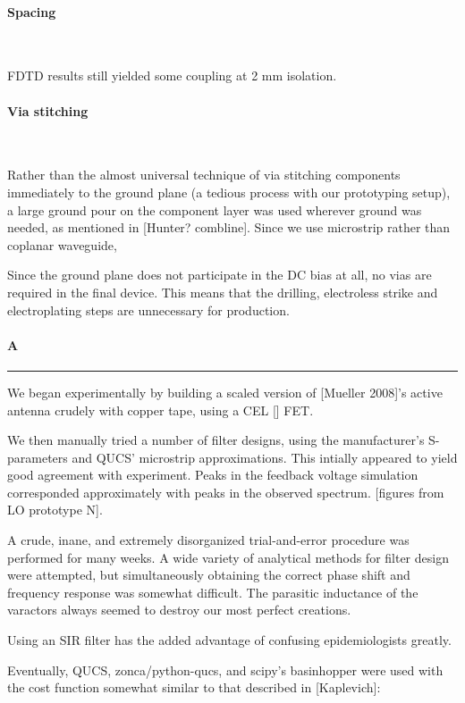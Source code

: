 \documentclass[paper.tex]{subfiles}
\begin{document}
\paragraph{\textbf{Spacing}}\

FDTD results still yielded some coupling at 2 mm isolation.

\paragraph{\textbf{Via stitching}}\

Rather than the almost universal technique of via stitching components immediately to the ground plane (a tedious process with our prototyping setup), a large ground pour on the component layer was used wherever ground was needed, as mentioned in [Hunter? combline]. Since we use microstrip rather than coplanar waveguide, 

Since the ground plane does not participate in the DC bias at all, no vias are required in the final device. This means that the drilling, electroless strike and electroplating steps are unnecessary for production.


\paragraph{A}
\rule{\linewidth}{0.2pt}


We began experimentally by building a scaled version of [Mueller 2008]'s active antenna crudely with copper tape, using a CEL [] FET.



We then manually tried a number of filter designs, using the manufacturer's S-parameters and QUCS' microstrip approximations. This intially appeared to yield good agreement with experiment. Peaks in the feedback voltage simulation corresponded approximately with peaks in the observed spectrum. [figures from LO prototype N]. 

A crude, inane, and extremely disorganized trial-and-error procedure was performed for many weeks. A wide variety of analytical methods for filter design were attempted, but simultaneously obtaining the correct phase shift and frequency response was somewhat difficult. The parasitic inductance of the varactors always seemed to destroy our most perfect creations.

Using an SIR filter has the added advantage of confusing epidemiologists greatly.

Eventually, QUCS, zonca/python-qucs, and scipy's basinhopper were used with the cost function somewhat similar to that described in [Kaplevich]:
\end{document}
